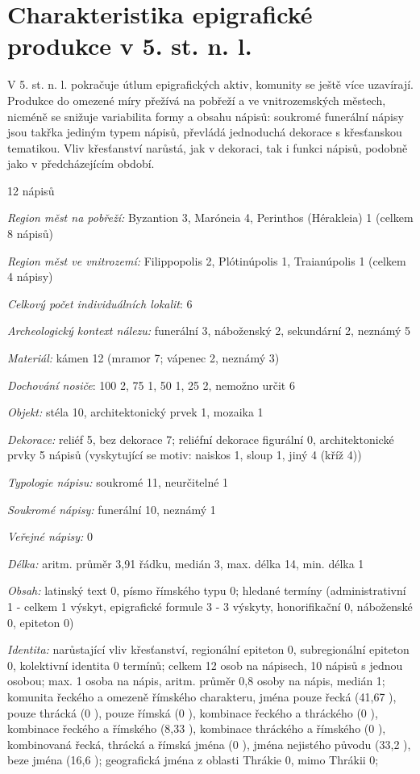 \section[charakteristika-epigrafické-produkce-v-5.-st.-n.-l.]{Charakteristika epigrafické produkce v 5. st. n. l.}

V 5. st. n. l. pokračuje útlum epigrafických aktiv, komunity se ještě více uzavírají. Produkce do omezené míry přežívá na pobřeží a ve vnitrozemských městech, nicméně se snižuje variabilita formy a obsahu nápisů: soukromé funerální nápisy jsou takřka jediným typem nápisů, převládá jednoduchá dekorace s křesťanskou tematikou. Vliv křesťanství narůstá, jak v dekoraci, tak i funkci nápisů, podobně jako v předcházejícím období.

\placetable[none]{}
\starttable[|l|]
\HL
{} 12 nápisů

{\em Region měst na pobřeží:} Byzantion 3, Maróneia 4, Perinthos (Hérakleia) 1 (celkem 8 nápisů)

{\em Region měst ve vnitrozemí:} Filippopolis 2, Plótinúpolis 1, Traianúpolis 1 (celkem 4 nápisy)

{\em Celkový počet individuálních lokalit}: 6

{\em Archeologický kontext nálezu:} funerální 3, náboženský 2, sekundární 2, neznámý 5

{\em Materiál:} kámen 12 (mramor 7; vápenec 2, neznámý 3)

{\em Dochování nosiče}: 100  2, 75  1, 50  1, 25  2, nemožno určit 6

{\em Objekt:} stéla 10, architektonický prvek 1, mozaika 1

{\em Dekorace:} reliéf 5, bez dekorace 7; reliéfní dekorace figurální 0, architektonické prvky 5 nápisů (vyskytující se motiv: naiskos 1, sloup 1, jiný 4 (kříž 4))

{\em Typologie nápisu:} soukromé 11, neurčitelné 1

{\em Soukromé nápisy:} funerální 10, neznámý 1

{\em Veřejné nápisy:} 0

{\em Délka:} aritm. průměr 3,91 řádku, medián 3, max. délka 14, min. délka 1

{\em Obsah:} latinský text 0, písmo římského typu 0; hledané termíny (administrativní 1 - celkem 1 výskyt, epigrafické formule 3 - 3 výskyty, honorifikační 0, náboženské 0, epiteton 0)

{\em Identita:} narůstající vliv křesťanství, regionální epiteton 0, subregionální epiteton 0, kolektivní identita 0 termínů; celkem 12 osob na nápisech, 10 nápisů s jednou osobou; max. 1 osoba na nápis, aritm. průměr 0,8 osoby na nápis, medián 1; komunita řeckého a omezeně římského charakteru, jména pouze řecká (41,67 ), pouze thrácká (0 ), pouze římská (0 ), kombinace řeckého a thráckého (0 ), kombinace řeckého a římského (8,33 ), kombinace thráckého a římského (0 ), kombinovaná řecká, thrácká a římská jména (0 ), jména nejistého původu (33,2 ), beze jména (16,6 ); geografická jména z oblasti Thrákie 0, mimo Thrákii 0;

